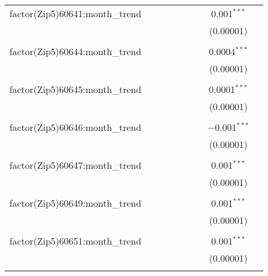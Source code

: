 \begin{table}[H]
{\begin{tabular}{@{\extracolsep{5pt}}lcccccccc}
  factor(Zip5)60641:month\_trend &  &  &  &  &  &  & 0.001$^{***}$ &  \\  

   &  &  &  &  &  &  & (0.00001) &  \\  

   & & & & & & & & \\  

  factor(Zip5)60644:month\_trend &  &  &  &  &  &  & 0.0004$^{***}$ &  \\  

   &  &  &  &  &  &  & (0.00001) &  \\  

   & & & & & & & & \\  

  factor(Zip5)60645:month\_trend &  &  &  &  &  &  & 0.0001$^{***}$ &  \\  

   &  &  &  &  &  &  & (0.00001) &  \\  

   & & & & & & & & \\  

  factor(Zip5)60646:month\_trend &  &  &  &  &  &  & $-$0.001$^{***}$ &  \\  

   &  &  &  &  &  &  & (0.00001) &  \\  

   & & & & & & & & \\  

  factor(Zip5)60647:month\_trend &  &  &  &  &  &  & 0.001$^{***}$ &  \\  

   &  &  &  &  &  &  & (0.00001) &  \\  

   & & & & & & & & \\  

  factor(Zip5)60649:month\_trend &  &  &  &  &  &  & 0.001$^{***}$ &  \\  

   &  &  &  &  &  &  & (0.00001) &  \\  

   & & & & & & & & \\  

  factor(Zip5)60651:month\_trend &  &  &  &  &  &  & 0.001$^{***}$ &  \\  

   &  &  &  &  &  &  & (0.00001) &  \\  

   & & & & & & & & \\  


\end{tabular}}
\end{table}
